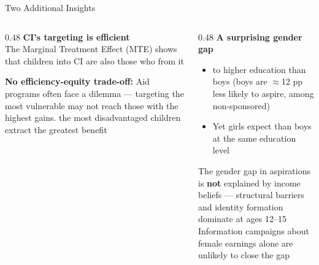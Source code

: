 \documentclass[aspectratio=169, 10pt]{beamer}
\begin{document}
\begin{frame}{Two Additional Insights}
  \begin{columns}
    \begin{column}{0.48\textwidth}
      \textbf{ CI's targeting is efficient}\\[0.4em]
      The Marginal Treatment Effect (MTE) shows that children  into CI are also those who  from it
      \begin{resultbox}
        \small \textbf{No efficiency-equity trade-off:} Aid programs often face a dilemma — targeting the most vulnerable may not reach those with the highest gains.  the most disadvantaged children extract the greatest benefit
      \end{resultbox}
    \end{column}
    \begin{column}{0.48\textwidth}
      \textbf{ A surprising gender gap}\\[0.4em]
      \begin{itemize}
        \item {} to higher education than boys (boys are $\approx$12 pp less likely to aspire, among non-sponsored)
        \item Yet girls expect  than boys at the same education level
      \end{itemize}
      \begin{keybox}
        \small The gender gap in aspirations is \textbf{not} explained by income beliefs — structural barriers and identity formation dominate at ages 12--15\\[0.3em]
        Information campaigns about female earnings alone are unlikely to close the gap
      \end{keybox}
    \end{column}
  \end{columns}
\end{frame}
\end{document}
